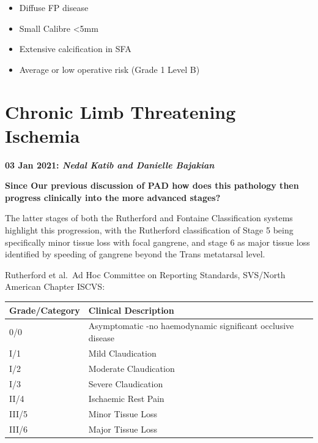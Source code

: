 \documentclass[
]{book}
\begin{document}
\begin{itemize}
\begin{itemize}
\begin{itemize}
      \begin{itemize}
      \item
        Diffuse FP disease
      \item
        Small Calibre \textless5mm
      \item
        Extensive calcification in SFA
      \item
        Average or low operative risk (Grade 1 Level B)
      \end{itemize}
    \end{itemize}
  \end{itemize}
\end{itemize}

\hypertarget{chronic-limb-threatening-ischemia}{%
\section{Chronic Limb Threatening Ischemia}\label{chronic-limb-threatening-ischemia}}

\textbf{03 Jan 2021: \emph{Nedal Katib and Danielle Bajakian}}

\textbf{Since Our previous discussion of PAD how does this pathology then
progress clinically into the more advanced stages?}

The latter stages of both the Rutherford and Fontaine Classification
systems highlight this progression, with the Rutherford classification
of Stage 5 being specifically minor tissue loss with focal gangrene, and
stage 6 as major tissue loss identified by speeding of gangrene beyond
the Trans metatarsal level.

Rutherford et al.~Ad Hoc Committee on Reporting Standards, SVS/North
American Chapter ISCVS:

\begin{longtable}[]{@{}ll@{}}
\toprule
Grade/Category & Clinical Description \\
\midrule
\endhead
0/0 & Asymptomatic -no haemodynamic significant occlusive disease \\
I/1 & Mild Claudication \\
I/2 & Moderate Claudication \\
I/3 & Severe Claudication \\
II/4 & Ischaemic Rest Pain \\
III/5 & Minor Tissue Loss \\
III/6 & Major Tissue Loss \\
\bottomrule
\end{longtable}
\end{document}
